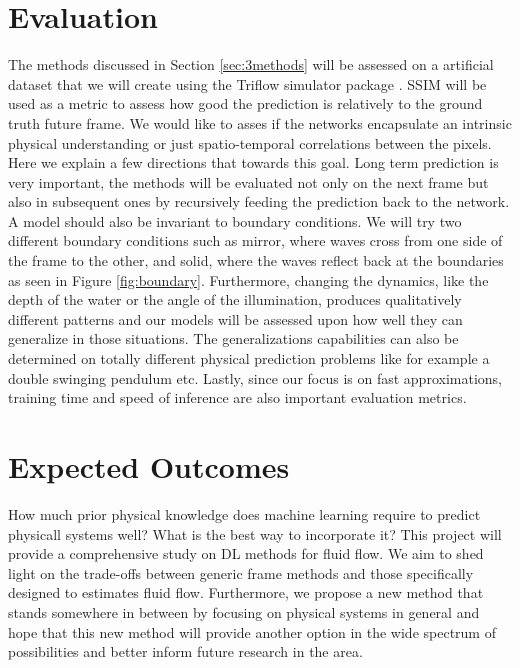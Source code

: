 \documentclass[a4paper,11pt]{article}
\begin{document}
\section{Evaluation}\label{sec:4evaluation}


The methods discussed in Section \ref{sec:3methods} will be assessed on a artificial dataset that we will create using the Triflow simulator package \cite{CELLIER_2018triflow}. SSIM will be used as a metric to assess how good the prediction is relatively to the ground truth future frame. We would like to asses if the networks encapsulate an intrinsic physical understanding or just spatio-temporal correlations between the pixels. Here we explain a few directions that towards this goal. Long term prediction is very important, the methods will be evaluated not only on the next frame but also in subsequent ones by recursively feeding the prediction back to the network. A model should also be invariant to boundary conditions. We will try two different boundary conditions such as mirror, where waves cross from one side of the frame to the other, and solid, where the waves reflect back at the boundaries as seen in Figure \ref{fig:boundary}. Furthermore, changing the dynamics, like the depth of the water or the angle of the illumination, produces qualitatively different patterns and our models will be assessed upon how well they can generalize in those situations. The generalizations capabilities can also be determined on totally different physical prediction problems like for example a double swinging pendulum etc. Lastly, since our focus is on fast approximations, training time and speed of inference are also important evaluation metrics.

\section{Expected Outcomes}\label{sec:5outcomes}

How much prior physical knowledge does machine learning require to predict physicall systems well? What is the best way to incorporate it? This project will provide a comprehensive study on DL methods for fluid flow. We aim to shed light on the trade-offs between generic frame methods and those specifically designed to estimates fluid flow. Furthermore, we propose a new method that stands somewhere in between by focusing on physical systems in general and hope that this new method will provide another option in the wide spectrum of possibilities and better inform future research in the area.
\end{document}
